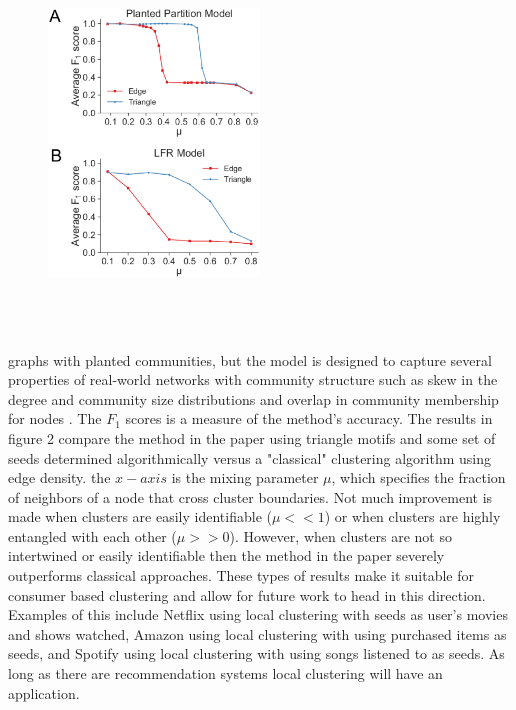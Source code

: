 \documentclass[12pt]{article}
\theoremstyle{remark}
\begin{document}
\begin{figure}
	\vspace{-15pt}
	\hspace{0pt}
	\includegraphics[height=10cm,width=0.5\textwidth]{fig3.eps}
	\caption{}
	\vspace{-14pt}
\end{figure} 

graphs with planted communities, but the model is designed to capture several properties of real-world networks with community structure such
as skew in the degree and community size distributions and overlap
in community membership for nodes \cite{complementary}. The $F_1$ scores is a measure of the method's accuracy. The results in figure 2 compare the method in the paper using triangle motifs and some set of seeds determined algorithmically versus a "classical" clustering algorithm using edge density. the $x-axis$ is the mixing parameter $\mu$, which specifies the fraction of neighbors of a node that cross cluster boundaries. Not much improvement is made when clusters are easily identifiable ($\mu << 1$) or when clusters are highly entangled with each other ($\mu >> 0$). However, when clusters are not so intertwined or easily identifiable then the method in the paper severely outperforms classical approaches. These types of results make it suitable for consumer based clustering and allow for future work to head in this direction. Examples of this include Netflix using local clustering with seeds as user's movies and shows watched, Amazon using local clustering with using purchased items as seeds, and Spotify using local clustering with using songs listened to as seeds. As long as there are recommendation systems local clustering will have an application. \\
\end{document}
